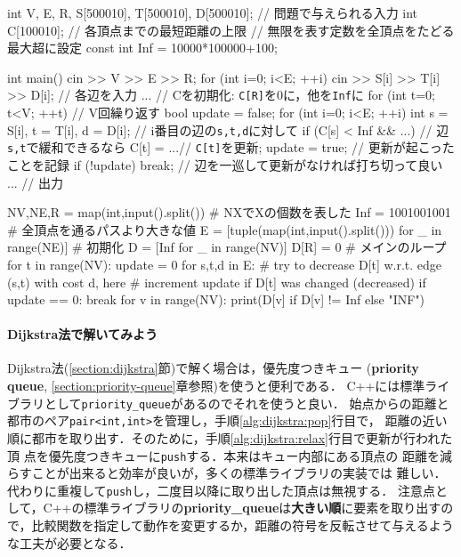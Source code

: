 \begin{cbox}
int V, E, R, S[500010], T[500010], D[500010]; // 問題で与えられる入力
int C[100010]; // 各頂点までの最短距離の上限
// 無限を表す定数を全頂点をたどる最大超に設定
const int Inf = 10000*100000+100;

int main() {
  cin >> V >> E >> R;
  for (int i=0; i<E; ++i) 
    cin >> S[i] >> T[i] >> D[i]; // 各辺を入力
  ... // Cを初期化: \texttt{C[R]}を0に，他を\texttt{Inf}に
  for (int t=0; t<V; ++t) { // V回繰り返す
    bool update = false;
    for (int i=0; i<E; ++i) {
      int s = S[i], t = T[i], d = D[i]; // i番目の辺の\texttt{s,t,d}に対して
      if (C[s] < Inf && ...) { // 辺\texttt{s,t}で緩和できるなら
	C[t] = ...// \texttt{C[t]}を更新;
	update = true; // 更新が起こったことを記録
      }
    }
    if (!update) break; // 辺を一巡して更新がなければ打ち切って良い
  }
  ... // 出力
}
\end{cbox}

\begin{pybox}
NV,NE,R = map(int,input().split()) # NXでXの個数を表した
Inf = 1001001001 # 全頂点を通るパスより大きな値
E = [tuple(map(int,input().split())) for _ in range(NE)]
# 初期化
D = [Inf for _ in range(NV)]
D[R] = 0
# メインのループ
for t in range(NV):
    update = 0
    for s,t,d in E:
        # try to decrease D[t] w.r.t. edge (s,t) with cost d, here
        # increment update if D[t] was changed (decreased)
    if update == 0:
        break
for v in range(NV):
    print(D[v] if D[v] != Inf else "INF")  
\end{pybox}


\paragraph{Dijkstra法で解いてみよう}
Dijkstra法(\ref{section:dijkstra}節)で解く場合は，優先度つきキュー
(\textbf{priority queue}, \ref{section:priority-queue}章参照)を使うと便利である．
C++には標準ライブラリとして\texttt{priority\_queue}があるのでそれを使うと良い．
始点からの距離と都市のペア\texttt{pair<int,int>}を管理し，手順\ref{alg:dijkstra:pop}行目で，
距離の近い順に都市を取り出す．そのために，手順\ref{alg:dijkstra:relax}行目で更新が行われた頂
点を優先度つきキューに\texttt{push}する．本来はキュー内部にある頂点の
距離を減らすことが出来ると効率が良いが，多くの標準ライブラリの実装では
難しい．代わりに重複して\texttt{push}し，二度目以降に取り出した頂点は無視する．
注意点として，C++の標準ライブラリの\textbf{priority\_queue}は\textbf{大きい順}に要素を取り出すので，比較関数を指定して動作を変更するか，距離の符号を反転させて与えるような工夫が必要となる．

